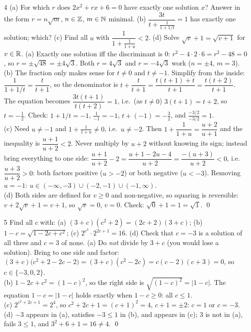 \begin{bookex}{4}
(a) For which $r$ does $2x^2+rx+6=0$ have exactly one solution $x$? Answer in the form $r=n\sqrt m$, $n\in\mathbb{Z}$, $m\in\mathbb{N}$ minimal. (b) $\dfrac{3t}{t+\frac{1}{1+1/t}}=1$ has exactly one solution; which? (c) Find all $u$ with $\dfrac{1}{1+\frac1{1+u}}<2$. (d) Solve $\sqrt v+1=\sqrt{v+1}$ for $v\in\mathbb{R}$.
\solution
(a) Exactly one solution iff the discriminant is $0$: $r^2-4\cdot2\cdot6=r^2-48=0$, so $r=\pm\sqrt{48}=\pm4\sqrt3$. Both $r=4\sqrt3$ and $r=-4\sqrt3$ work ($n=\pm4$, $m=3$).\\
(b) The fraction only makes sense for $t\ne0$ and $t\ne-1$. Simplify from the inside: $\dfrac1{1+1/t}=\dfrac{t}{t+1}$, so the denominator is $t+\dfrac t{t+1}=\dfrac{t(t+1)+t}{t+1}=\dfrac{t(t+2)}{t+1}$. The equation becomes $\dfrac{3t(t+1)}{t(t+2)}=1$, i.e.\ (as $t\ne0$) $3(t+1)=t+2$, so $t=-\tfrac12$. Check: $1+1/t=-1$, $\frac1{-1}=-1$, $t+(-1)=-\frac32$, and $\frac{-3/2}{-3/2}=1$. \checkmark\\
(c) Need $u\ne-1$ and $1+\frac1{1+u}\ne0$, i.e.\ $u\ne-2$. Then $1+\dfrac1{1+u}=\dfrac{u+2}{u+1}$ and the inequality is $\dfrac{u+1}{u+2}<2$. Never multiply by $u+2$ without knowing its sign; instead bring everything to one side: $\dfrac{u+1}{u+2}-2=\dfrac{u+1-2u-4}{u+2}=\dfrac{-(u+3)}{u+2}<0$, i.e.\ $\dfrac{u+3}{u+2}>0$: both factors positive ($u>-2$) or both negative ($u<-3$). Removing $u=-1$: $u\in(-\infty,-3)\cup(-2,-1)\cup(-1,\infty)$.\\
(d) Both sides are defined for $v\ge0$ and non-negative, so squaring is reversible: $v+2\sqrt v+1=v+1$, so $\sqrt v=0$, $v=0$. Check: $\sqrt0+1=1=\sqrt1$. \checkmark\qed
\end{bookex}

\begin{bookex}{5}
Find all $c$ with: (a) $(3+c)(c^2+2)=(2c+2)(3+c)$; (b) $1-c=\sqrt{1-2c+c^2}$; (c) $2^{c^2}\cdot2^{2c+1}=16$. (d) Check that $c=-3$ is a solution of all three and $c=3$ of none.
\solution
(a) Do \emph{not} divide by $3+c$ (you would lose a solution). Bring to one side and factor: $(3+c)\big(c^2+2-2c-2\big)=(3+c)(c^2-2c)=c(c-2)(c+3)=0$, so $c\in\{-3,0,2\}$.\\
(b) $1-2c+c^2=(1-c)^2$, so the right side is $\sqrt{(1-c)^2}=|1-c|$. The equation $1-c=|1-c|$ holds exactly when $1-c\ge0$: all $c\le1$.\\
(c) $2^{c^2+2c+1}=2^4$, so $c^2+2c+1=(c+1)^2=4$, $c+1=\pm2$: $c=1$ or $c=-3$.\\
(d) $-3$ appears in (a), satisfies $-3\le1$ in (b), and appears in (c); $3$ is not in (a), fails $3\le1$, and $3^2+6+1=16\ne4$. \checkmark\qed
\end{bookex}

